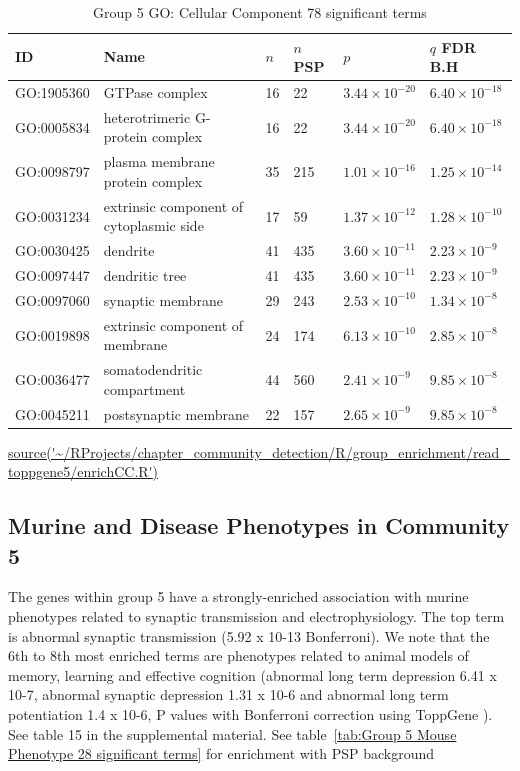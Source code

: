 \begin{table}[ht]
\centering
\setlength{\extrarowheight}{2pt}
\begin{adjustbox}{width=\textwidth}
\begin{tabular}{llllll}
  \toprule
ID & Name &$n$ &$n$ PSP& $p$ & $q$ FDR B.H \\ 
  \midrule
GO:1905360 & GTPase complex & 16 & 22 & $3.44 \times 10^{-20}$ & $6.40 \times 10^{-18}$ \\ 
  GO:0005834 & heterotrimeric G-protein complex & 16 & 22 & $3.44 \times 10^{-20}$ & $6.40 \times 10^{-18}$ \\ 
  GO:0098797 & plasma membrane protein complex & 35 & 215 & $1.01 \times 10^{-16}$ & $1.25 \times 10^{-14}$ \\ 
  GO:0031234 & extrinsic component of cytoplasmic side  & 17 & 59 & $1.37 \times 10^{-12}$ & $1.28 \times 10^{-10}$ \\ 
  GO:0030425 & dendrite & 41 & 435 & $3.60 \times 10^{-11}$ & $2.23 \times 10^{-9}$ \\ 
  GO:0097447 & dendritic tree & 41 & 435 & $3.60 \times 10^{-11}$ & $2.23 \times 10^{-9}$ \\ 
  GO:0097060 & synaptic membrane & 29 & 243 & $2.53 \times 10^{-10}$ & $1.34 \times 10^{-8}$ \\ 
  GO:0019898 & extrinsic component of membrane & 24 & 174 & $6.13 \times 10^{-10}$ & $2.85 \times 10^{-8}$ \\ 
  GO:0036477 & somatodendritic compartment & 44 & 560 & $2.41 \times 10^{-9}$ & $9.85 \times 10^{-8}$ \\ 
  GO:0045211 & postsynaptic membrane & 22 & 157 & $2.65 \times 10^{-9}$ & $9.85 \times 10^{-8}$ \\ 
   \bottomrule
\end{tabular}
\end{adjustbox}
\caption{Group 5 GO: Cellular Component 78 significant terms} 
\tiny\url{source('~/RProjects/chapter_community_detection/R/group_enrichment/read_toppgene5/enrichCC.R')}
\label{tab:Group 5 GO: Cellular Component 78 significant terms}
\end{table}

    
\subsection{Murine and Disease Phenotypes in Community 5}
The genes within group 5 have a strongly-enriched association with murine phenotypes related to synaptic transmission and electrophysiology. The top term is abnormal synaptic transmission (5.92 x 10-13 Bonferroni). We note that the 6th to 8th most enriched terms are phenotypes related to animal models of memory, learning and effective cognition (abnormal long term depression 6.41 x 10-7, abnormal synaptic depression 1.31 x 10-6 and abnormal long term potentiation 1.4 x 10-6, P values with Bonferroni correction using ToppGene \cite{chen2009toppgene} ). See table 15 in the supplemental material. See table~\ref{tab:Group 5 Mouse Phenotype 28 significant terms} for enrichment with PSP background


